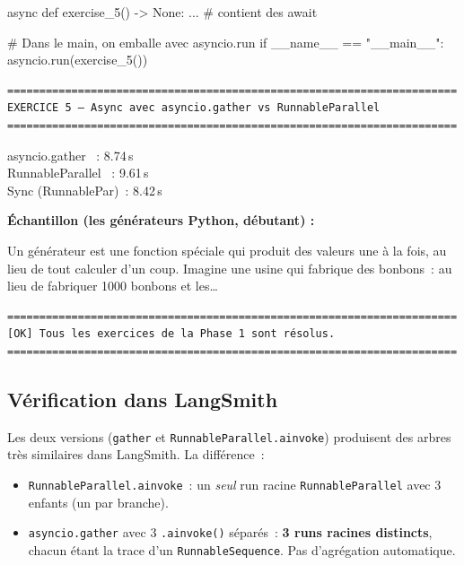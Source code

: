 \documentclass[11pt,a4paper]{article}
\begin{document}
\begin{pythoncode}
async def exercise_5() -> None:
    ...                          # contient des await

# Dans le main, on emballe avec asyncio.run
if __name__ == "__main__":
    asyncio.run(exercise_5())
\end{pythoncode}

\begin{tcolorbox}[
  colback=white,
  colframe=black!50,
  coltitle=black,
  fonttitle=\footnotesize\bfseries,
  fontupper=\footnotesize,
  title=Sortie de l'exécution,
  breakable,
]
\begin{verbatim}
======================================================================
EXERCICE 5 — Async avec asyncio.gather vs RunnableParallel
======================================================================
\end{verbatim}

asyncio.gather   ~: 8.74\,s\\
RunnableParallel ~: 9.61\,s\\
Sync (RunnablePar)~: 8.42\,s

\textbf{Échantillon (les générateurs Python, débutant) :}

Un générateur est une fonction spéciale qui produit des valeurs une à la
fois, au lieu de tout calculer d'un coup. Imagine une usine qui fabrique
des bonbons~: au lieu de fabriquer 1000 bonbons et les\dots

\begin{verbatim}
======================================================================
[OK] Tous les exercices de la Phase 1 sont résolus.
======================================================================
\end{verbatim}
\end{tcolorbox}

\subsection{Vérification dans LangSmith}

Les deux versions (\texttt{gather} et \texttt{RunnableParallel.ainvoke})
produisent des arbres très similaires dans LangSmith. La différence~:

\begin{itemize}[leftmargin=*]
  \item \texttt{RunnableParallel.ainvoke}~: un \emph{seul} run racine
        \texttt{RunnableParallel} avec 3 enfants (un par branche).
  \item \texttt{asyncio.gather} avec 3 \texttt{.ainvoke()} séparés~:
        \textbf{3 runs racines distincts}, chacun étant la trace d'un
        \texttt{RunnableSequence}. Pas d'agrégation automatique.
\end{itemize}
\end{document}

